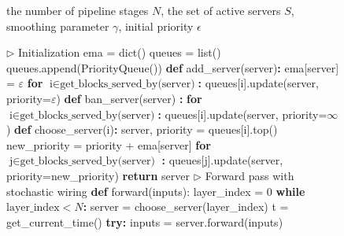 \begin{figure}[t]
\vspace{-1em}
\begin{algorithm}[H]
  \label{alg:wiring}
\begin{algorithmic}[1]
  \INPUT the number of pipeline stages $N$, the set of active servers $S$, smoothing parameter $\gamma$, initial priority $\epsilon$

  \STATE \(\triangleright\) Initialization
  \STATE ema = dict()
  \STATE queues = list()
  \STATE queues.append(PriorityQueue())
  \ENDFOR
  \STATE \textbf{def} add\_server(server)\textbf{:}
      \STATE \hspace{12px} ema[server] = $\varepsilon$
      \STATE \hspace{12px} \textbf{for} $\text{i} \in \text{get\_blocks\_served\_by(server)}$\textbf{:}
        \STATE \hspace{24px} queues[i].update(server, priority=$\varepsilon$)
  \STATE \textbf{def} ban\_server(server) \textbf{:}
      \STATE \hspace{12px} \textbf{for} $\text{i} \in \text{get\_blocks\_served\_by(server)}$\textbf{:}
        \STATE \hspace{24px} queues[i].update(server, priority=$\infty$)
  \STATE \textbf{def} choose\_server(i)\textbf{:}
      \STATE \hspace{12px} server, priority = queues[i].top()
      \STATE \hspace{12px} new\_priority = priority + ema[server]
      \STATE \hspace{12px} \textbf{for} $\text{j} \in \text{get\_blocks\_served\_by(server)}$ \textbf{:}
          \STATE \hspace{24px} queues[j].update(server, priority=new\_priority)
      \STATE \hspace{12px} \textbf{return} server
  \STATE \(\triangleright\) Forward pass with stochastic wiring
  \STATE \textbf{def} forward(inputs):
      \STATE \hspace{12px} layer\_index = 0
      \STATE \hspace{12px} \textbf{while} $\text{layer\_index} < N$\textbf{:}
          \STATE \hspace{24px} server = choose\_server(layer\_index)
          \STATE \hspace{24px} t = get\_current\_time()
          \STATE \hspace{24px} \textbf{try:}
          \STATE \hspace{36px} inputs = server.forward(inputs)

\end{algorithmic}
\end{algorithm}
\end{figure}
